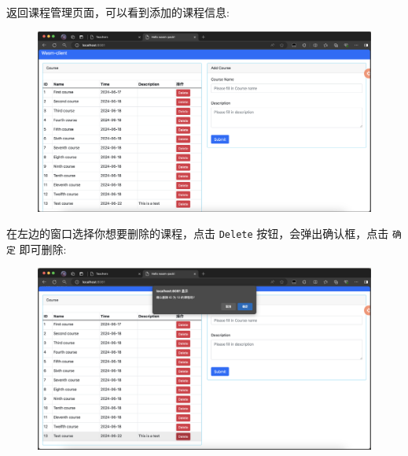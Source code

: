 \documentclass[12pt, oneside]{ctexart}
\numberwithin{figure}{section}
\numberwithin{table}{section}
\begin{document}
返回课程管理页面，可以看到添加的课程信息:
\begin{figure}[!htbp]
    \centering
    \includegraphics[width=13cm]{images/sec5/Add_Course_Success.png}
\end{figure}
\newpage
在左边的窗口选择你想要删除的课程，点击 \texttt{Delete} 按钮，会弹出确认框，点击 \texttt{确定} 即可删除:
\begin{figure}[!htbp]
    \centering
    \includegraphics[width=13cm]{images/sec5/Delete_Course.png}
\end{figure}
\end{document}
